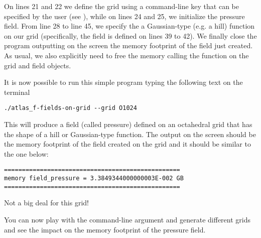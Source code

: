 On lines 21 and 22 we define the grid using a command-line key 
that can be specified by the user (see ), 
while on lines 24 and 25, we initialize the pressure field.
From line 28 to line 45, we specify the a Gaussian-type 
(e.g. a hill) function on our grid (specifically, the 
field is defined on lines 39 to 42).
We finally close the program outputting on the screen 
the memory footprint of the field just created. As usual,
we also explicitly need to free the memory calling the 
function  on the grid and field objects.

It is now possible to run this simple program typing
the following text on the terminal
%
\begin{lstlisting}[style=BashStyle]
./atlas_f-fields-on-grid --grid O1024
\end{lstlisting}
% 
This will produce a field (called pressure) defined 
on an octahedral grid that has the shape of a hill 
or Gaussian-type function.
The output on the screen should be the memory footprint 
of the field created on the grid and it should be similar 
to the one below:
%
\begin{lstlisting}[style=BashStyle]
=================================================
memory field_pressure = 3.3849344000000003E-002 GB
=================================================
\end{lstlisting}
% 
Not a big deal for this grid!

You can now play with the command-line argument and 
generate different grids and see the impact on the 
memory footprint of the pressure field.